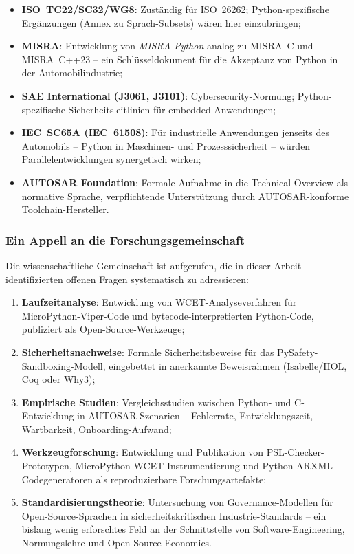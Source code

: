 ﻿\documentclass[12pt,a4paper,twoside]{article}
\begin{document}
\begin{itemize}
  \item \textbf{ISO~TC22/SC32/WG8}: Zuständig für ISO~26262;
        Python-spezifische Ergänzungen (Annex zu Sprach-Subsets)
        wären hier einzubringen;
  \item \textbf{MISRA}: Entwicklung von \textit{MISRA Python} analog zu
        MISRA~C und MISRA~C++23 -- ein Schlüsseldokument für die
        Akzeptanz von Python in der Automobilindustrie;
  \item \textbf{SAE International (J3061, J3101)}: Cybersecurity-Normung;
        Python-spezifische Sicherheitsleitlinien für embedded Anwendungen;
  \item \textbf{IEC~SC65A (IEC~61508)}: Für industrielle Anwendungen
        jenseits des Automobils -- Python in Maschinen- und Prozesssicherheit --
        würden Parallelentwicklungen synergetisch wirken;
  \item \textbf{AUTOSAR Foundation}: Formale Aufnahme in die
        Technical Overview als normative Sprache, verpflichtende
        Unterstützung durch AUTOSAR-konforme Toolchain-Hersteller.
\end{itemize}

\subsubsection{Ein Appell an die Forschungsgemeinschaft}

Die wissenschaftliche Gemeinschaft ist aufgerufen, die in dieser Arbeit
identifizierten offenen Fragen systematisch zu adressieren:

\begin{enumerate}
  \item \textbf{Laufzeitanalyse}: Entwicklung von WCET-Analyseverfahren
        für MicroPython-Viper-Code und bytecode-interpretierten Python-Code,
        publiziert als Open-Source-Werkzeuge;
  \item \textbf{Sicherheitsnachweise}: Formale Sicherheitsbeweise für
        das PySafety-Sandboxing-Modell, eingebettet in anerkannte
        Beweisrahmen (Isabelle/HOL, Coq oder Why3);
  \item \textbf{Empirische Studien}: Vergleichsstudien zwischen Python-
        und C-Entwicklung in AUTOSAR-Szenarien -- Fehlerrate, Entwicklungszeit,
        Wartbarkeit, Onboarding-Aufwand;
  \item \textbf{Werkzeugforschung}: Entwicklung und Publikation von
        PSL-Checker-Prototypen, MicroPython-WCET-Instrumentierung und
        Python-ARXML-Codegeneratoren als reproduzierbare
        Forschungsartefakte;
  \item \textbf{Standardisierungstheorie}: Untersuchung von Governance-Modellen
        für Open-Source-Sprachen in sicherheitskritischen Industrie-Standards --
        ein bislang wenig erforschtes Feld an der Schnittstelle von
        Software-Engineering, Normungslehre und Open-Source-Economics.
\end{enumerate}
\end{document}
